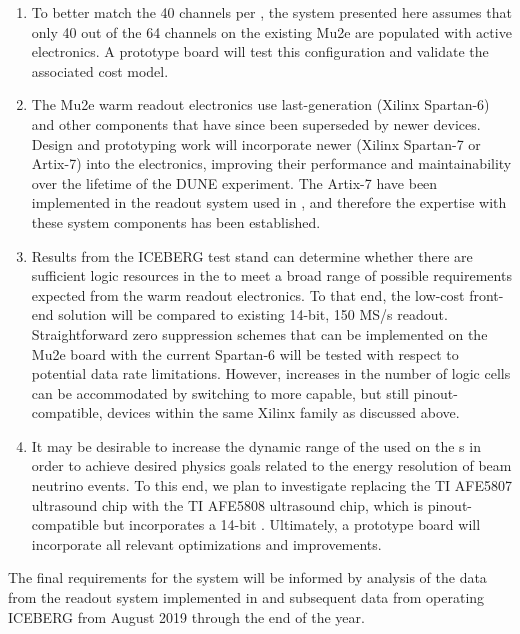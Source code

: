 \begin{enumerate}
\item To better match the 40  channels per , the system presented here assumes that only 40 out of the 64 channels on the existing Mu2e  are populated with active electronics.  A prototype board will test this configuration and validate the associated cost model.

\item The Mu2e warm readout electronics use last-generation (Xilinx\texttrademark{} Spartan-6)  and other components that have since been superseded by newer devices.  Design and prototyping work will 
incorporate newer  (Xilinx Spartan-7 or Artix-7) into the electronics,
improving their performance and maintainability over the lifetime of the DUNE experiment. The Artix-7  have been implemented in the  readout system used in , and therefore the expertise with these system components has been established. 

\item Results from the ICEBERG test stand can determine whether there are sufficient logic resources in the  to meet a broad range of possible  requirements expected from the warm readout electronics. To that end, the low-cost front-end solution will be compared to existing 14-bit, 150 MS/s  readout.  Straightforward zero suppression schemes that can be implemented on the Mu2e board with the current Spartan-6  will be tested with respect to potential  data rate limitations.  However, increases in the number of logic cells can be accommodated by switching to more capable, but still pinout-compatible, devices within the same Xilinx  family as discussed above.

\item It may be desirable to increase the dynamic range of the  used on the s in order to achieve desired physics goals related to the energy resolution of beam neutrino events.  To this end, we plan to investigate replacing the TI AFE5807 ultrasound chip with the TI AFE5808 ultrasound chip, which is pinout-compatible but incorporates a 14-bit .  Ultimately, a prototype board will incorporate all relevant optimizations and improvements.

\end{enumerate}

The final requirements for the system will be informed by analysis of the data from the readout system implemented in  and subsequent data from operating ICEBERG from August 2019 through the end of the year.

